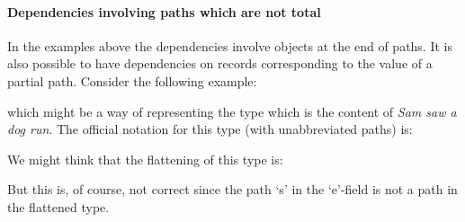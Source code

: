 \paragraph{Dependencies involving paths which are not total}  
In the examples above the dependencies involve objects at the end of
paths.  It is also possible to have dependencies on records
corresponding to the value of a partial path.  Consider the following
example:
\begin{quote}
\end{quote}
which might be a way of representing the type which is the content of
\textit{Sam saw a dog run}.  The official notation for this type (with
unabbreviated paths) is:
\begin{quote}
\end{quote}
\label{pg:sam-saw-a-dog-run}
We might think that the flattening of this type is:
\begin{quote}
\end{quote} 
But this is, of course, not correct since the path `s' in the
`e'-field is not a path in the flattened type.  
